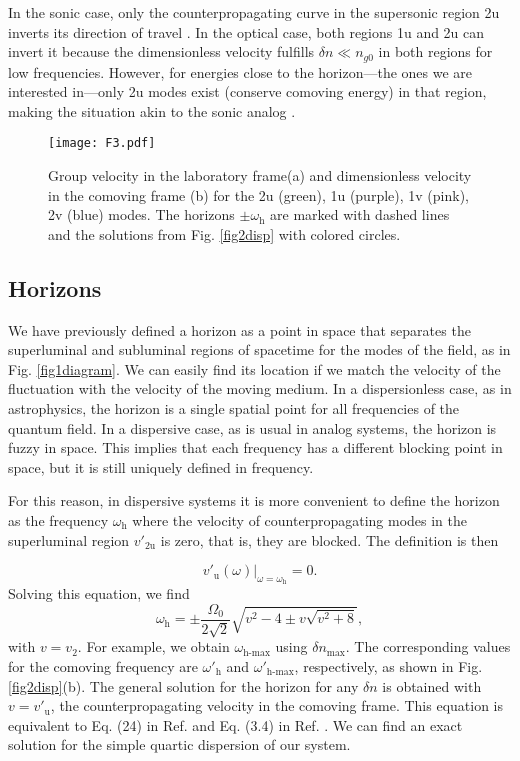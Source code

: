 \documentclass[aps,pra,reprint,amsmath,amssymb,showpacs,groupedaddress,floatfix]{revtex4-1}
\begin{document}
In the sonic case, only the counterpropagating curve in the supersonic region 2u inverts its direction of travel \cite{2018Bermudez}. In the optical case, both regions 1u and 2u can invert it because the dimensionless velocity fulfills $\delta n \ll n_{g0}$  in both regions for low frequencies. However, for energies close to the horizon---the ones we are interested in---only 2u modes exist (conserve comoving energy) in that region, making the situation akin to the sonic analog \cite{2018Bermudez}.

\begin{figure}
	\centering
	\texttt{[image: F3.pdf]}
	\caption{Group velocity in the laboratory frame(a) and dimensionless velocity in the comoving frame (b) for the 2u (green), 1u (purple), 1v (pink), 2v (blue) modes. The horizons $\pm \omega_\text{h}$ are marked with dashed lines and the solutions from Fig. \ref{fig2disp} with colored circles.}
	\label{fig3vels}
\end{figure}

\subsection{Horizons}\label{sechorizons}
We have previously defined a horizon as a point in space that separates the superluminal and subluminal regions of spacetime for the modes of the field, as in Fig. \ref{fig1diagram}. We can easily find its location if we match the velocity of the fluctuation with the velocity of the moving medium. In a dispersionless case, as in astrophysics, the horizon is a single spatial point for all frequencies of the quantum field. In a dispersive case, as is usual in analog systems, the horizon is fuzzy in space. This implies that each frequency has a different blocking point in space, but it is still uniquely defined in frequency.

For this reason, in dispersive systems it is more convenient to define the horizon as the frequency $\omega_\text{h}$ where the velocity of counterpropagating modes in the superluminal region $v'_\text{2u}$ is zero, that is, they are blocked. The definition is then

\begin{equation}
v'_\text{u}(\omega)|_{\omega=\omega_\text{h}}=0.
\end{equation}
Solving this equation, we find
\begin{equation}\label{horizontes}
\omega_\text{h}=\pm\frac{\Omega_0}{2\sqrt{2}}\sqrt{v^2-4\pm v\sqrt{v^2+8}},
\end{equation}
with $v=v_2$. For example, we obtain $\omega_\text{h-max}$ using $\delta n_\text{max}$. The corresponding values for the comoving frequency are $\omega'_\text{h}$ and $\omega'_\text{h-max}$, respectively, as shown in Fig. \ref{fig2disp}(b). The general solution for the horizon for any $\delta n$ is obtained with $v=v'_\text{u}$, the counterpropagating velocity in the comoving frame. This equation is equivalent to Eq. (24) in Ref. \cite{Larre2012} and Eq. (3.4) in Ref. \cite{2018Bermudez}. We can find an exact solution for the simple quartic dispersion of our system.
\end{document}
